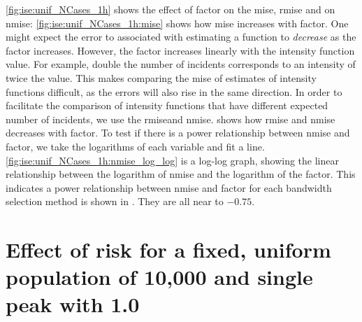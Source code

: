 \autoref{fig:ise:unif_NCases_1h} shows the effect of \gls{factor} on the \gls{mise}, \gls{rmise} and on \gls{nmise}:
\autoref{fig:ise:unif_NCases_1h:mise} shows how \gls{mise} increases with \gls{factor}.
One might expect the error to associated with estimating a function to \textit{decrease} as the \gls{factor} increases.
However, the \gls{factor} increases linearly with the intensity function value.
For example, double the number of incidents corresponds to an intensity of twice the value.
This makes comparing the \gls{mise} of estimates of intensity functions difficult,
as the errors will also rise in the same direction.
In order to facilitate the comparison of intensity functions that have different expected number of incidents,
we use the \gls{rmise}and \gls{nmise}.
 shows how \gls{rmise} and \gls{nmise} decreases with \gls{factor}.
To test if there is a power relationship between \gls{nmise} and \gls{factor},
we take the logarithms of each variable and fit a line.
\autoref{fig:ise:unif_NCases_1h:nmise_log_log} is a log-log graph,
showing the linear relationship between the logarithm of \gls{nmise} and the logarithm of the \gls{factor}.
This indicates a power relationship between \gls{nmise} and \gls{factor} for each bandwidth selection method is shown in .
They are all near to $-0.75$.




\section
    {Effect of risk  for a fixed, uniform population of 10,000 and single peak with  1.0}
\label{sec:results:spread}

